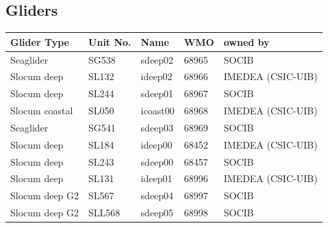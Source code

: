 \documentclass[10pt,landscape]{article}
\begin{document}
\begin{multicols}{2}

\subsection*{Gliders}
\begin{table}[H]
\begin{tabular}{lllll}
\toprule
Glider Type		& Unit No.	& Name		& WMO	& owned by \\
\midrule
Seaglider		& SG538		& sdeep02	& 68965	& SOCIB\\
Slocum deep		& SL132		& ideep02	& 68966	& IMEDEA (CSIC-UIB)\\
Slocum deep		& SL244		& sdeep01	& 68967	& SOCIB\\
Slocum coastal 	& SL050		& icoast00	& 68968	& IMEDEA (CSIC-UIB)\\
Seaglider		& SG541		& sdeep03	& 68969	& SOCIB\\
Slocum deep		& SL184		& ideep00	& 68452	& IMEDEA (CSIC-UIB)\\
Slocum deep		& SL243		& sdeep00	& 68457	& SOCIB\\
Slocum deep		& SL131		& ideep01	& 68996	& IMEDEA (CSIC-UIB)\\
Slocum deep G2 	& SL567		& sdeep04	& 68997	& SOCIB\\
Slocum deep G2 	& SLL568		& sdeep05	& 68998	& SOCIB\\
\bottomrule
\end{tabular}
\end{table}





\end{multicols}
\end{document}
